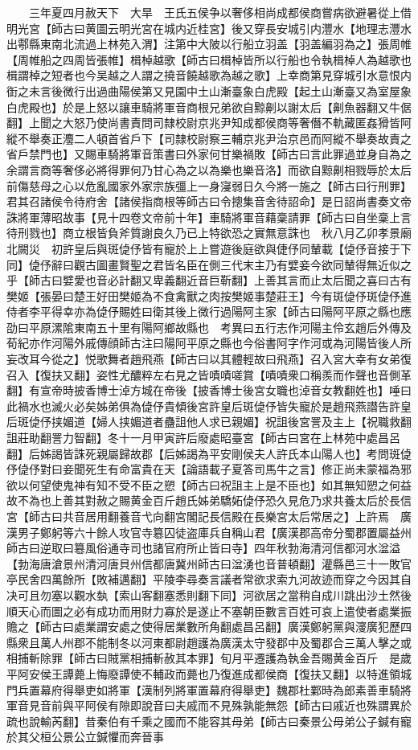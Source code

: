 　　三年夏四月赦天下　大旱　王氏五侯争以奢侈相尚成都侯商嘗病欲避暑從上借明光宮【師古曰黄圖云明光宮在城内近桂宮】後又穿長安城引内灃水【地理志灃水出鄠縣東南北流過上林苑入渭】注第中大陂以行船立羽盖【羽盖編羽為之】張周帷【周帷船之四周皆張帷】楫棹越歌【師古曰楫棹皆所以行船也令執楫棹人為越歌也楫謂棹之短者也今吴越之人謂之撓音饒越歌為越之歌】上幸商第見穿城引水意恨内衘之未言後微行出過曲陽侯第又見園中土山漸臺象白虎殿【起土山漸臺又為室屋象白虎殿也】於是上怒以讓車騎將軍音商根兄弟欲自黥劓以謝太后【劓魚器翻又牛倨翻】上聞之大怒乃使尚書責問司隸校尉京兆尹知成都侯商等奢僭不軌藏匿姦猾皆阿縱不舉奏正灋二人頓首省戶下【司隸校尉察三輔京兆尹治京邑而阿縱不舉奏故責之省戶禁門也】又賜車騎將軍音策書曰外家何甘樂禍敗【師古曰言此罪過並身自為之余謂言商等奢侈必將得罪何乃甘心為之以為樂也樂音洛】而欲自黥劓相戮辱於太后前傷慈母之心以危亂國家外家宗族彊上一身寖弱日久今將一施之【師古曰行刑罪】君其召諸侯令待府舍【諸侯指商根等師古曰令摠集音舍待詔命】是日詔尚書奏文帝誅將軍薄昭故事【見十四卷文帝前十年】車騎將軍音藉稾請罪【師古曰自坐稾上言待刑戮也】商立根皆負斧質謝良久乃已上特欲恐之實無意誅也　秋八月乙卯孝景廟北闕災　初許皇后與斑偼伃皆有寵於上上嘗遊後庭欲與倢伃同輦載【偼伃音接于下同】偼伃辭曰觀古圖畫賢聖之君皆名臣在側三代末主乃有嬖妾今欲同輦得無近似之乎【師古曰嬖愛也音必計翻又卑義翻近音巨靳翻】上善其言而止太后聞之喜曰古有樊姬【張晏曰楚王好田樊姬為不食禽獸之肉按樊姬事楚莊王】今有斑偼伃斑偼伃進侍者李平得幸亦為偼伃賜姓曰衛其後上微行過陽阿主家【師古曰陽阿平原之縣也應劭曰平原漯隂東南五十里有陽阿鄉故縣也　考異曰五行志作河陽主伶玄趙后外傳及荀紀亦作河陽外戚傳顔師古注曰陽阿平原之縣也今俗書阿字作河或為河陽皆後人所妄改耳今從之】悦歌舞者趙飛燕【師古曰以其體輕故曰飛燕】召入宮大幸有女弟復召入【復扶又翻】姿性尤醲粹左右見之皆嘖嘖嗟賞【嘖嘖衆口稱羨而作聲也音側革翻】有宣帝時披香博士淖方城在帝後【披香博士後宮女職也淖音女教翻姓也】唾曰此禍水也滅火必矣姊弟俱為偼伃貴傾後宮許皇后斑偼伃皆失寵於是趙飛燕譛告許皇后斑偼伃挟媚道【婦人挟媚道者蠱詛他人求已親媚】祝詛後宮詈及主上【祝職救翻詛莊助翻詈力智翻】冬十一月甲寅許后廢處昭臺宮【師古曰宮在上林苑中處昌呂翻】后姊謁皆誅死親屬歸故郡【后姊謁為平安剛侯夫人許氏本山陽人也】考問斑偼伃偼伃對曰妾聞死生有命富貴在天【論語載子夏答司馬牛之言】修正尚未蒙福為邪欲以何望使鬼神有知不受不臣之愬【師古曰祝詛主上是不臣也】如其無知愬之何益故不為也上善其對赦之賜黄金百斤趙氏姊弟驕妬偼伃恐久見危乃求共養太后於長信宮【師古曰共音居用翻養音弋向翻宮閣記長信殿在長樂宮太后常居之】上許焉　廣漢男子鄭躬等六十餘人攻官寺簒囚徒盗庫兵自稱山君【廣漢郡高帝分蜀郡置屬益州師古曰逆取曰簒風俗通寺司也諸官府所止皆曰寺】四年秋勃海清河信都河水湓溢【勃海唐滄景州清河唐貝州信都唐冀州師古曰湓湧也音普頓翻】灌縣邑三十一敗官亭民舍四萬餘所【敗補邁翻】平陵李尋奏言議者常欲求索九河故迹而穿之今因其自决可且勿塞以觀水埶【索山客翻塞悉則翻下同】河欲居之當稍自成川跳出沙土然後順天心而圖之必有成功而用財力寡於是遂止不塞朝臣數言百姓可哀上遣使者處業振贍之【師古曰處業謂安處之使得居業數所角翻處昌呂翻】廣漢鄭躬黨與濅廣犯歷四縣衆且萬人州郡不能制冬以河東都尉趙護為廣漢太守發郡中及蜀郡合三萬人擊之或相捕斬除罪【師古曰賊黨相捕斬赦其本罪】旬月平遷護為執金吾賜黄金百斤　是歲平阿安侯王譚薨上悔廢譚使不輔政而薨也乃復進成都侯商【復扶又翻】以特進領城門兵置幕府得舉吏如將軍【漢制列將軍置幕府得舉吏】魏郡杜鄴時為郎素善車騎將軍音見音前與平阿侯有隙即說音曰夫戚而不見殊孰能無怨【師古曰戚近也殊謂異於疏也說輸芮翻】昔秦伯有千乘之國而不能容其母弟【師古曰秦景公母弟公子鍼有寵於其父桓公景公立鍼懼而奔晉事